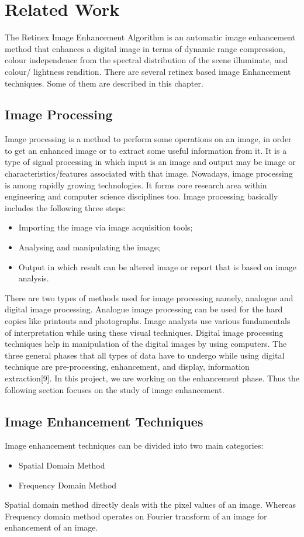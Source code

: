 \chapter{Related Work}
The Retinex Image Enhancement Algorithm is an automatic image enhancement method that enhances a digital image in terms of dynamic range compression, colour independence from the spectral distribution of the scene illuminate, and colour/ lightness rendition. There are several retinex based image Enhancement techniques. Some of them are described in this chapter.
\section{Image Processing}
Image processing is a method to perform some operations on an image, in order to get an enhanced image or to extract some useful information from it. It is a type of signal processing in which input is an image and output may be image or characteristics/features associated with that image. Nowadays, image processing is among rapidly growing technologies. It forms core research area within engineering and computer science disciplines too. Image processing basically includes the following three steps:
	\begin{itemize}
		\item Importing the image via image acquisition tools;
		\item Analysing and manipulating the image;
		\item Output in which result can be altered image or report that is based on image  		analysis.
	\end{itemize}
	
There are two types of methods used for image processing namely, analogue and digital image processing. Analogue image processing can be used for the hard copies like printouts and photographs. Image analysts use various fundamentals of interpretation while using these visual techniques. Digital image processing techniques help in manipulation of the digital images by using computers. The three general phases that all types of data have to undergo while using digital technique are pre-processing, enhancement, and display, information extraction[9]. In this project, we are working on the enhancement phase. Thus the following section focuses on the study of image enhancement.


\section{Image Enhancement Techniques}
Image enhancement techniques can be divided into two main categories:
\begin{itemize}
	\item Spatial Domain Method
	\item Frequency Domain Method
\end{itemize}
Spatial domain method directly deals with the pixel values of an image. Whereas Frequency domain method operates on Fourier transform of an image for enhancement of an image.


